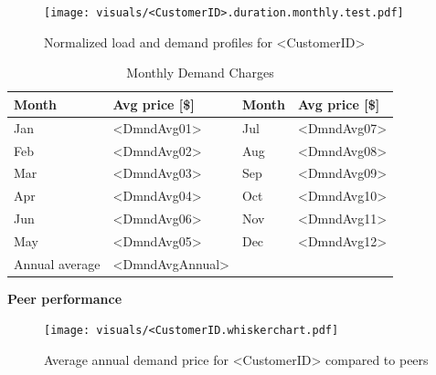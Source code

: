 \documentclass[11pt]{article}
\begin{document}
\begin{figure}[!h]
\centering
\texttt{[image: visuals/<CustomerID>.duration.monthly.test.pdf]}
\caption{Normalized load and demand profiles for <CustomerID>}
\label{fig:duration}
\end{figure}

\lipsum[1][1-7]

\begin{table}[th!]
  \centering
  \caption{Monthly Demand Charges}
  \vspace{1.5ex}
  \label{tab:demand}
  \begin{tabular}{llll}
    Month & Avg price [\$] & Month & Avg price [\$] \\
    \midrule
    Jan & <DmndAvg01> & Jul & <DmndAvg07> \\
    Feb & <DmndAvg02> & Aug & <DmndAvg08> \\
    Mar & <DmndAvg03> & Sep & <DmndAvg09> \\
    Apr & <DmndAvg04> & Oct & <DmndAvg10> \\
    Jun & <DmndAvg06> & Nov & <DmndAvg11> \\
    May & <DmndAvg05> & Dec & <DmndAvg12> \\
    \midrule
    Annual average & <DmndAvgAnnual>
  \end{tabular}
\end{table}

\vspace{3ex}
\textbf{\Large Peer performance}
\vspace{1ex}

\lipsum[1][1-7]

\begin{figure}[!h]
\centering
\texttt{[image: visuals/<CustomerID.whiskerchart.pdf]}
\caption{Average annual demand price for <CustomerID> compared to peers}
\label{fig:PeerCompDmnd}
\end{figure}
\end{document}
